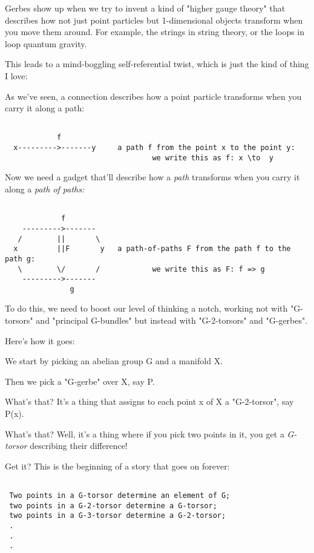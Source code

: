 Gerbes show up when we try to invent a kind of "higher gauge theory" 
that describes how not just point particles but 1-dimensional objects
transform when you move them around.  For example, the strings in string 
theory, or the loops in loop quantum gravity.  

This leads to a mind-boggling self-referential twist, which is just the
kind of thing I love:

As we've seen, a connection describes how a point particle transforms when 
you carry it along a path:


\begin{verbatim}

            f
  x--------->-------y     a path f from the point x to the point y:
                                  we write this as f: x \to  y
\end{verbatim}
    
Now we need a gadget that'll describe how a \emph{path} transforms when you 
carry it along a \emph{path of paths:}


\begin{verbatim}

             f
    --------->-------
   /        ||       \
  x         ||F       y   a path-of-paths F from the path f to the path g:
   \        \/       /            we write this as F: f => g
    --------->-------
               g
\end{verbatim}
    

To do this, we need to boost our level of thinking a notch, working
not with "G-torsors" and "principal G-bundles" but
instead with "G-2-torsors" and "G-gerbes".

Here's how it goes:

We start by picking an abelian group G and a manifold X.  

Then we pick a "G-gerbe" over X, say P.   

What's that?  It's a thing that assigns to each point x of X a
"G-2-torsor", say P(x).

What's that?  Well, it's a thing where if you pick two points in it, you 
get a \emph{G-torsor} describing their difference!   

Get it?  This is the beginning of a story that goes on forever:


\begin{verbatim}

 Two points in a G-torsor determine an element of G;
 two points in a G-2-torsor determine a G-torsor;
 two points in a G-3-torsor determine a G-2-torsor;
 .
 .
 .
\end{verbatim}
    
